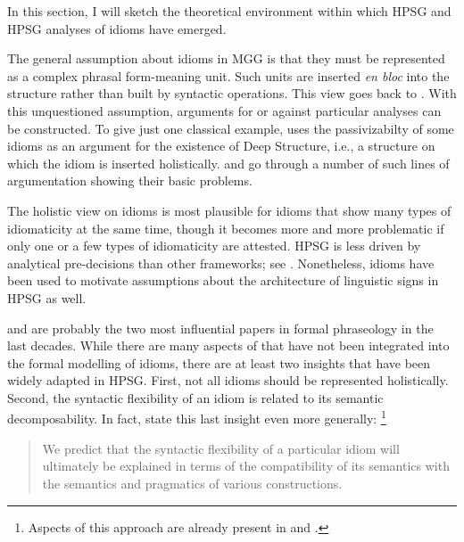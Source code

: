 \documentclass[output=paper
                ,modfonts
                ,nonflat
	        ,collection
	        ,collectionchapter
	        ,collectiontoclongg
 	        ,biblatex
                ,babelshorthands
                ,newtxmath
                ,draftmode
                ,colorlinks, citecolor=brown
]{./langsci/langscibook}
\begin{document}
In this section, I will sketch the theoretical environment within which HPSG and HPSG analyses of idioms have emerged.

The general assumption about idioms in MGG is that they
must be represented as a complex phrasal form-meaning unit. 
Such units are inserted \emph{en bloc} into the structure rather than built by syntactic operations.
This view goes back to \cite[]{Chomsky:65}. 
With this unquestioned assumption, arguments for or against particular analyses can be constructed. 
To give just one classical example, \citet{Chomsky81a} uses the passivizabilty of some idioms as an argument for the existence of Deep Structure, i.e., a structure on which the idiom is inserted holistically. 
%
\citet{Ruwet:91} and \citet{NSW94a} go through a number of such lines of argumentation showing their basic problems. 

The holistic view on idioms is most plausible for idioms that show many types of idiomaticity at the same time, though it becomes more and more problematic if only one or a few types of idiomaticity are attested.
HPSG is less driven by analytical pre-decisions than other frameworks; see . Nonetheless, idioms have been used to motivate assumptions about the architecture of linguistic signs in HPSG as well.

\citet{WSN84a-u} and \citet{NSW94a} are probably the two most influential papers in formal phraseology in the last decades. 
While there are many aspects of \citet{NSW94a} that have not been integrated into the formal modelling of idioms, 
there are at least two insights that have been widely adapted in HPSG.
First, not all idioms should be represented holistically. 
Second, the syntactic flexibility of an idiom is related to its semantic decomposability. 
In fact, \citet{NSW94a} state this last insight even more generally:%
\footnote{Aspects of this approach are already present in \citet{Higgins:74} and \citet{Newmeyer:74}.}

\begin{quote}
We predict that the syntactic flexibility of a particular idiom will ultimately be explained in terms of the compatibility of its semantics with the semantics and pragmatics of various constructions.
\citep[]{NSW94a}\label{NSW-quote}
\end{quote}
\end{document}
